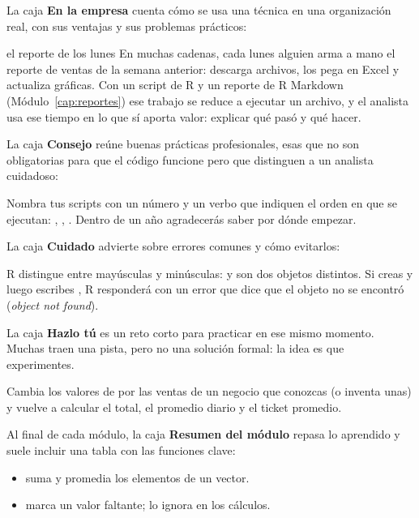 La caja \textbf{En la empresa} cuenta cómo se usa una técnica en una
organización real, con sus ventajas y sus problemas prácticos:

\begin{negocio}{el reporte de los lunes}
En muchas cadenas, cada lunes alguien arma a mano el reporte de ventas de
la semana anterior: descarga archivos, los pega en Excel y actualiza
gráficas. Con un script de R y un reporte de R Markdown
(Módulo~\ref{cap:reportes}) ese trabajo se reduce a ejecutar un archivo, y
el analista usa ese tiempo en lo que sí aporta valor: explicar qué pasó y
qué hacer.
\end{negocio}

La caja \textbf{Consejo} reúne buenas prácticas profesionales, esas que no
son obligatorias para que el código funcione pero que distinguen a un
analista cuidadoso:

\begin{consejo}
Nombra tus scripts con un número y un verbo que indiquen el orden en que se
ejecutan: , ,
. Dentro de un año agradecerás saber por dónde
empezar.
\end{consejo}

La caja \textbf{Cuidado} advierte sobre errores comunes y cómo evitarlos:

\begin{advertencia}
R distingue entre mayúsculas y minúsculas:  y
 son dos objetos distintos. Si creas  y luego
escribes , R responderá con un error que dice que el objeto
no se encontró (\textit{object not found}).
\end{advertencia}

La caja \textbf{Hazlo tú} es un reto corto para practicar en ese mismo
momento. Muchas traen una pista, pero no una solución formal: la idea es
que experimentes.

\begin{hazlotu}
Cambia los valores de  por las ventas de un negocio
que conozcas (o inventa unas) y vuelve a calcular el total, el promedio
diario y el ticket promedio.
\end{hazlotu}

Al final de cada módulo, la caja \textbf{Resumen del módulo} repasa lo
aprendido y suele incluir una tabla con las funciones clave:

\begin{resumen}[title={Resumen del módulo (ejemplo)}]
\begin{itemize}
  \item {} suma y  promedia los elementos de un
        vector.
  \item {} marca un valor faltante;  lo
        ignora en los cálculos.
\end{itemize}
\end{resumen}

